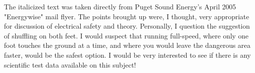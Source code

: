 
The italicized text was taken directly from Puget Sound Energy's April 2005 "Energywise" mail flyer.  The points brought up were, I thought, very appropriate for discussion of electrical safety and theory.  Personally, I question the suggestion of shuffling on both feet.  I would suspect that running full-speed, where only one foot touches the ground at a time, and where you would leave the dangerous area faster, would be the safest option.  I would be very interested to see if there is any scientific test data available on this subject!




